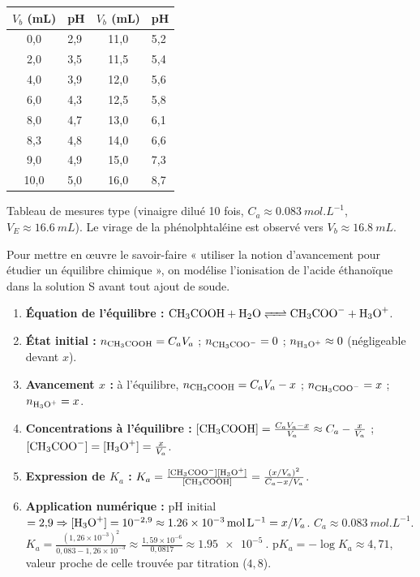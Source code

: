 \documentclass[11pt]{article}
\newcounter{popsec}
\newcounter{popsub}
\newcommand{\courssub}[1]{%
  \stepcounter{popsub}%
  \par\vspace{9pt}\noindent{\popxbold\fontsize{11.5}{13}\selectfont\color{popink}{\color{poporange}\thepopsec.\thepopsub}\hspace{6pt}#1}\par\nopagebreak\vspace{4pt}
}
\begin{document}
\begin{center}
\begin{tabularx}{\linewidth}{|c|X|c|X|}
\hline
\rowcolor{popgold!50} $V_b$ (mL) & pH & $V_b$ (mL) & pH \\
\hline
0,0 & 2,9 & 11,0 & 5,2 \\
2,0 & 3,5 & 11,5 & 5,4 \\
4,0 & 3,9 & 12,0 & 5,6 \\
6,0 & 4,3 & 12,5 & 5,8 \\
8,0 & 4,7 & 13,0 & 6,1 \\
8,3 & 4,8 & 14,0 & 6,6 \\
9,0 & 4,9 & 15,0 & 7,3 \\
10,0 & 5,0 & 16,0 & 8,7 \\
\hline
\end{tabularx}
\end{center}

Tableau de mesures type (vinaigre dilué 10 fois, $C_a \approx \SI{0,083}{mol.L^{-1}}$, $V_E \approx \SI{16,6}{mL}$). Le virage de la phénolphtaléine est observé vers $V_b \approx \SI{16,8}{mL}$.

\courssub{Exploitation}

\begin{methode}
Pour mettre en œuvre le savoir-faire « utiliser la notion d'avancement pour étudier un équilibre chimique », on modélise l'ionisation de l'acide éthanoïque dans la solution S avant tout ajout de soude.
\begin{enumerate}
\item \textbf{Équation de l'équilibre :} $\ce{CH3COOH + H2O <=> CH3COO- + H3O+}$.
\item \textbf{État initial :} $n_{\ce{CH3COOH}} = C_a V_a$ ; $n_{\ce{CH3COO-}} = 0$ ; $n_{\ce{H3O+}} \approx 0$ (négligeable devant $x$).
\item \textbf{Avancement $x$ :} à l'équilibre, $n_{\ce{CH3COOH}} = C_a V_a - x$ ; $n_{\ce{CH3COO-}} = x$ ; $n_{\ce{H3O+}} = x$.
\item \textbf{Concentrations à l'équilibre :} $[\ce{CH3COOH}] = \frac{C_a V_a - x}{V_a} \approx C_a - \frac{x}{V_a}$ ; $[\ce{CH3COO-}] = [\ce{H3O+}] = \frac{x}{V_a}$.
\item \textbf{Expression de $K_a$ :} $K_a = \frac{[\ce{CH3COO-}][\ce{H3O+}]}{[\ce{CH3COOH}]} = \frac{(x/V_a)^2}{C_a - x/V_a}$.
\item \textbf{Application numérique :} pH initial $= 2{,}9 \Rightarrow [\ce{H3O+}] = 10^{-2,9} \approx \SI{1,26e-3}{mol.L^{-1}} = x/V_a$.
$C_a \approx \SI{0,083}{mol.L^{-1}}$.
$K_a = \frac{(1,26 \times 10^{-3})^2}{0,083 - 1,26 \times 10^{-3}} \approx \frac{1,59 \times 10^{-6}}{0,0817} \approx \SI{1,95e-5}{}$.
$\mathrm{p}K_a = -\log K_a \approx 4{,}71$, valeur proche de celle trouvée par titration ($4{,}8$).
\end{enumerate}
\end{methode}
\end{document}
